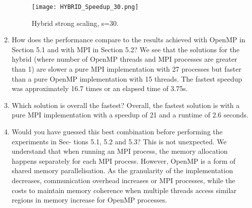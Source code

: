 \documentclass{article}
\begin{document}
\begin{enumerate}
				\begin{figure}[p] %
		 	\begin{center}
		 		\texttt{[image: HYBRID\_Speedup\_30.png]} %
		 		\caption{Hybrid strong scaling, s=30.}
		 		\label{fig:hybrid_strongscaling_s30}
		 	\end{center}
		\end{figure}
	
	\item How does the performance compare to the results achieved with OpenMP in Section 5.1
	and with MPI in Section 5.2?
	We see that the solutions for the hybrid (where number of OpenMP threads and MPI processes are greater than 1) are slower a pure MPI implementation with 27 processes but faster than a pure OpenMP implementation with 15 threads. The fastest speedup was approximately 16.7 times or an elapsed time of 3.75s. 
	
	\item Which solution is overall the fastest?
	Overall, the fastest solution is with a pure MPI implementation with a speedup of 21 and a runtime of 2.6 seconds.
	
	
	\item Would you have guessed this best combination before performing the experiments in Sec-
tions 5.1, 5.2 and 5.3?
	This is not unexpected. We understand that when running an MPI process, the memory allocation happens separately for each MPI process. However, OpenMP is a form of shared memory parallelisation. As the granularity of the implementation decreases, communication overhead increases or MPI processes, while the costs to maintain memory coherence when multiple threads access similar regions in memory increase for OpenMP processes.

\end{enumerate}
\end{document}
